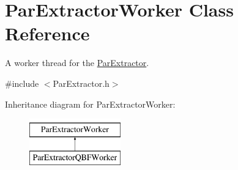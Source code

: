 \hypertarget{classParExtractorWorker}{\section{Par\-Extractor\-Worker Class Reference}
\label{classParExtractorWorker}
}


A worker thread for the \hyperlink{classParExtractor}{Par\-Extractor}.  




{\ttfamily \#include $<$Par\-Extractor.\-h$>$}

Inheritance diagram for Par\-Extractor\-Worker\-:\begin{figure}[H]
\begin{center}
\leavevmode
\includegraphics[height=2.000000cm]{classParExtractorWorker}
\end{center}
\end{figure}
